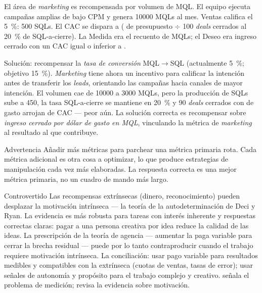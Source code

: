 \begin{example}
El área de \emph{marketing} es recompensada por volumen de MQL. El equipo ejecuta campañas amplias de bajo CPM y genera \num{10000} MQLs al mes. Ventas califica el \qty{5}{\percent}: \num{500} SQLs. El CAC se dispara a  ( de presupuesto $\div$ \num{100} \emph{deals} cerrados al \qty{20}{\percent} de SQL-a-cierre). La Medida era el recuento de MQLs; el Deseo era ingreso cerrado con un CAC igual o inferior a .

Solución: recompensar la \emph{tasa de conversión} MQL$\to$SQL (actualmente \qty{5}{\percent}; objetivo \qty{15}{\percent}). \emph{Marketing} tiene ahora un incentivo para calificar la intención antes de transferir los \emph{leads}, orientando las campañas hacia canales de mayor intención. El volumen cae de \num{10000} a \num{3000} MQLs, pero la producción de SQLs sube a \num{450}, la tasa SQL-a-cierre se mantiene en \qty{20}{\percent} y \num{90} \emph{deals} cerrados con  de gasto arrojan  de CAC --- peor aún. La solución correcta es recompensar sobre \emph{ingreso cerrado por dólar de gasto en MQL}, vinculando la métrica de \emph{marketing} al resultado al que contribuye.
\end{example}

\begin{admonition}{Advertencia}
Añadir más métricas para parchear una métrica primaria rota. Cada métrica adicional es otra cosa a optimizar, lo que produce estrategias de manipulación cada vez más elaboradas. La respuesta correcta es una mejor métrica primaria, no un cuadro de mando más largo.
\end{admonition}

\begin{admonition}{Controvertido}
Las recompensas extrínsecas (dinero, reconocimiento) pueden desplazar la motivación intrínseca --- la teoría de la autodeterminación de Deci y Ryan. La evidencia es más robusta para tareas con interés inherente y respuestas correctas claras: pagar a una persona creativa por idea reduce la calidad de las ideas. La prescripción de la teoría de agencia --- aumentar la paga variable para cerrar la brecha residual --- puede por lo tanto contraproducir cuando el trabajo requiere motivación intrínseca. La conciliación: usar pago variable para resultados medibles y compatibles con la extrínseca (cuotas de ventas, tasas de error); usar señales de autonomía y propósito para el trabajo complejo y creativo. \textcite{kerr1975folly} señala el problema de medición; \textcite{robbins2022} revisa la evidencia sobre motivación.
\end{admonition}

